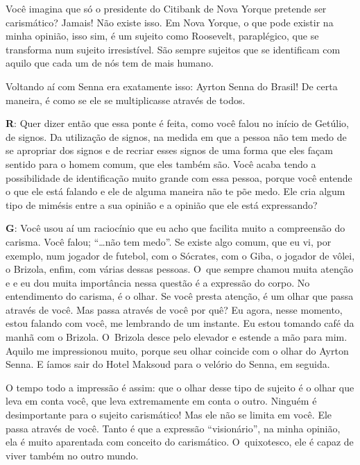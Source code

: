 Você imagina que só o presidente do Citibank de Nova Yorque pretende ser
carismático? Jamais! Não existe isso. Em Nova Yorque, o que pode existir
na minha opinião, isso sim, é um sujeito como Roosevelt, paraplégico,
que se transforma num sujeito irresistível. São sempre sujeitos que
se identificam com aquilo que cada um de nós tem de mais humano.

 

Voltando aí com Senna era exatamente isso: Ayrton Senna do Brasil! De
certa maneira, é como se ele se multiplicasse através de todos.

 

\textbf{R}: Quer dizer então que essa ponte é feita, como você falou no
início de Getúlio, de signos. Da utilização de signos, na medida em que
a pessoa não tem medo de se apropriar dos signos e de recriar esses
signos de uma forma que eles façam sentido para o homem comum, que eles
também são. Você acaba tendo a possibilidade de identificação muito
grande com essa pessoa, porque você entende o que ele está falando e ele
de alguma maneira não te põe medo. Ele cria algum tipo de mimésis entre
a sua opinião e a opinião que ele está expressando?

 

\textbf{G}: Você usou aí um raciocínio que eu acho que facilita muito a
compreensão do carisma. Você falou; ``…não tem medo''. Se existe
algo comum, que eu vi, por exemplo, num jogador de futebol, com o Sócrates,
com o Giba, o jogador de vôlei, o Brizola, enfim, com várias dessas
pessoas. O~que sempre chamou muita atenção e e eu dou muita importância
nessa questão é a expressão do corpo. No entendimento do carisma, é o
olhar. Se você presta atenção, é um olhar que passa através de você. Mas
passa através de você por quê? Eu agora, nesse momento, estou falando com
você, me lembrando de um instante. Eu estou tomando café da manhã com o
Brizola. O~Brizola desce pelo elevador e estende a mão para mim. Aquilo
me impressionou muito, porque seu olhar coincide com o olhar do Ayrton
Senna. E íamos sair do Hotel Maksoud para o velório do Senna, em seguida.

 

O tempo todo a impressão é assim: que o olhar desse tipo de sujeito é
o olhar que leva em conta você, que leva extremamente em conta o outro.
Ninguém é desimportante para o sujeito carismático! Mas ele não se limita em você.
Ele passa através de você. Tanto é que a expressão ``visionário'', na
minha opinião, ela é muito aparentada com conceito do carismático. O~quixotesco, ele é capaz de viver também no outro mundo.

